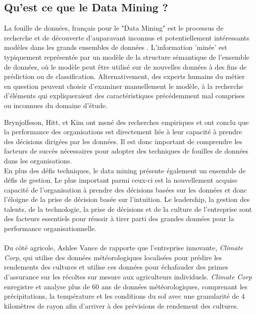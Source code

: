 \subsection{Qu'est ce que le Data Mining ?}
La fouille de données, français pour le "Data Mining" est le processus de recherche et de découverte d'auparavant inconnus et potentiellement intéressants modèles dans les grands ensembles de données \cite{def-DM}. L'information 'minée' est typiquement représentée par un modèle de la structure sémantique de l'ensemble de données, où le modèle peut être utilisé sur de nouvelles données à des fins de prédiction ou de classification. Alternativement, des experts humains du métier en question peuvent choisir d'examiner manuellement le modèle, à la recherche d'éléments qui expliqueraient des caractéristiques précédemment mal comprises ou inconnues du domaine d'étude.
\par
Brynjolfsson, Hitt, et Kim\cite{data-driven-des} ont mené des recherches empiriques et ont conclu que la performance des organisations est directement liée à leur capacité à prendre des décisions dirigées par les données. Il est donc important de comprendre les facteurs de succès nécessaires pour adopter des techniques de fouilles de données dans les organisations.\\
En plus des défis techniques, le data mining présente également un ensemble de défis de gestion. Le plus important parmi ceux-ci est la nouvellement acquise capacité de l'organisation à prendre des décisions basées sur les données et donc l'éloigne de la prise de décision basée sur l'intuition. Le leadership, la gestion des talents, de la technologie, la prise de décisions et de la culture de l'entreprise sont des facteurs essentiels pour réussir à tirer parti des grandes données pour la performance organisationnelle\cite{mcafee12}.\paragraph{}
Du côté agricole, Ashlee Vance de rapporte que l'entreprise innovante, \textit{Climate Corp}, qui utilise des données météorologiques localisées pour prédire les rendements des cultures et utilise ces données pour échafauder des primes d'assurance sur les récoltes sur mesure aux agriculteurs individuels. \textit{Climate Corp} enregistre et analyse plus de 60 ans de données météorologiques, comprenant les précipitations, la température et les conditions du sol avec une granularité de 4 kilomètres de rayon afin d'arriver à des prévisions de rendement des cultures\cite{vince12}.\par
